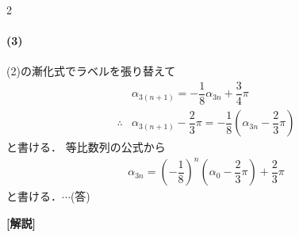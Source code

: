 \documentclass[../../main.tex]{subfiles}
\begin{document}
\begin{multicols}{2}
  \paragraph{(3)}
  (2)の漸化式でラベルを張り替えて
  \begin{align}
    & \alpha_{3(n+1)}                  = -\dfrac{1}{8}\alpha_{3n} + \dfrac{3}{4}\pi              \\
    \therefore
    & \alpha_{3(n+1)} - \dfrac{2}{3}\pi = -\dfrac{1}{8}\left(\alpha_{3n} - \dfrac{2}{3}\pi\right)
  \end{align}
  と書ける．
  等比数列の公式から
  \begin{align}
    \alpha_{3n} = \left(-\dfrac{1}{8}\right)^n \left(\alpha_0 - \dfrac{2}{3}\pi\right) + \dfrac{2}{3}\pi
  \end{align}
  と書ける．$\cdots$(答)

  {\bf [解説]}

  \newpage
\end{multicols}
\end{document}
